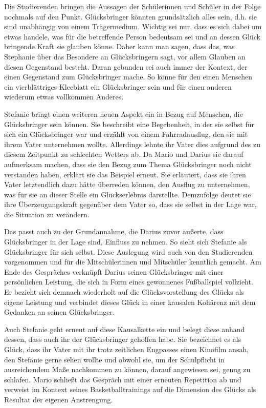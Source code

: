 Die Studierenden bringen die Aussagen der Schülerinnen und Schüler in der Folge nochmals auf den Punkt. 
Glücksbringer könnten grundsätzlich alles sein, d.h. sie sind unabhängig von einem Trägermedium. 
Wichtig sei nur, dass es sich dabei um etwas handele, was für die betreffende Person bedeutsam sei und an dessen Glück bringende Kraft sie glauben könne. 
Daher kann man sagen, dass das, was Stephanie über das Besondere an Glücksbringern sagt, vor allem Glauben an diesen Gegenstand besteht.
Daran gebunden sei auch immer der Kontext, der einen Gegenstand zum Glücksbringer mache. 
So könne für den einen Menschen ein vierblättriges Kleeblatt ein Glücksbringer sein und für einen anderen wiederum etwas vollkommen Anderes.

Stefanie bringt einen weiteren neuen Aspekt ein in Bezug auf Menschen, die Glücksbringer sein können. 
Sie beschreibt eine Begebenheit, in der sie selbst für sich ein Glücksbringer war und erzählt von einem Fahrradausflug, den sie mit ihrem Vater unternehmen wollte.
Allerdings lehnte ihr Vater dies aufgrund des zu diesem Zeitpunkt zu schlechten Wetters ab. 
Da Mario und Darius sie darauf aufmerksam machen, dass sie den Bezug zum Thema \glqq Glücksbringer\grqq{} noch nicht verstanden haben, erklärt sie das Beispiel erneut. 
Sie erläutert, dass sie ihren Vater letztendlich dazu hätte überreden können, den Ausflug zu unternehmen, was für sie an dieser Stelle ein Glückserlebnis darstellte. 
Demzufolge deutet sie ihre Überzeugungskraft gegenüber dem Vater so, dass sie selbst in der Lage war, die Situation zu verändern. 

Das passt auch zu der Grundannahme, die Darius zuvor äußerte, dass Glücksbringer in der Lage sind, Einfluss zu nehmen. 
So sieht sich Stefanie als Glücksbringer für sich selbst. 
Diese Auslegung wird auch von den Studierenden vorgenommen und für die Mitschülerinnen und Mitschüler kenntlich gemacht.
Am Ende des Gespräches verknüpft Darius seinen Glücksbringer mit einer persönlichen Leistung, die sich in Form eines gewonnenes Fußballspiel vollzieht. 
Er bezieht sich demnach wiederholt auf die Glücksvorstellung des Glücks als eigene Leistung und verbindet dieses Glück in einer kausalen Kohärenz mit dem Gedanken an seinen Glücksbringer.

Auch Stefanie geht erneut auf diese Kausalkette ein und belegt diese anhand dessen, dass auch ihr der Glücksbringer geholfen habe. 
Sie bezeichnet es als Glück, dass ihr Vater mit ihr trotz zeitlichen Engpasses einen Kinofilm ansah, den Stefanie gerne sehen wollte und obwohl sie, um der Schulpflicht in ausreichendem Maße nachkommen zu können, darauf angewiesen sei, genug zu schlafen. Mario schließt das Gespräch mit einer erneuten Repetition ab und verweist im Kontext seines Basketballtrainings auf die Dimension des Glücks als Resultat der eigenen Anstrengung.

